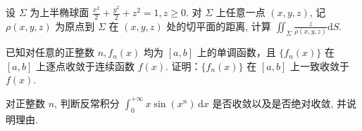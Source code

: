 设 $\Sigma$ 为上半椭球面 $\frac{x^2}{2} + \frac{y^2}{2} + z^2 = 1, z \geq 0$. 对 $\Sigma$ 上任意一点 $(x, y, z)$, 记 $\rho(x, y, z)$ 为原点到 $\Sigma$ 在 $(x, y, z)$ 处的切平面的距离, 计算 $\iint_{\Sigma} \frac{z}{\rho(x, y, z)} \mathrm{d}S$.\par
已知对任意的正整数 $n, f_n(x)$ 均为 $[a, b]$ 上的单调函数，且 $\{f_n(x)\}$ 在 $[a, b]$ 上逐点收敛于连续函数 $f(x)$. 证明：$\{f_n(x)\}$ 在 $[a, b]$ 上一致收敛于 $f(x)$.\par
对正整数 $n$, 判断反常积分 $\int_0^{+\infty} x \sin(x^n) \, \mathrm{d}x$ 是否收敛以及是否绝对收敛, 并说明理由.\par
